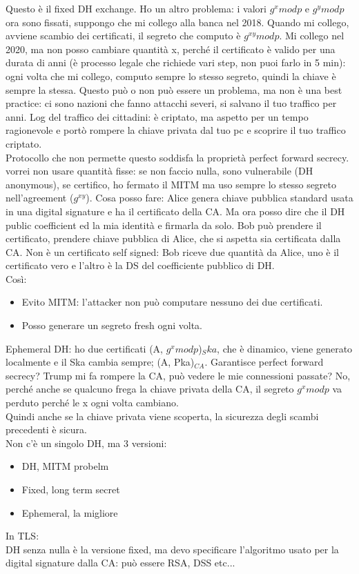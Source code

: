 \documentclass[16px]{article}
\begin{document}
Questo è il fixed DH exchange. Ho un altro problema: i valori $g^xmodp$ e $g^ymodp$ ora sono fissati, suppongo che mi collego alla banca nel 2018. Quando mi collego, avviene scambio dei certificati, il segreto che computo è $g^{xy}modp$. Mi collego nel 2020, ma non posso cambiare quantità x, perché il certificato è valido per una durata di anni (è processo legale che richiede vari step, non puoi farlo in 5 min): ogni volta che mi collego, computo sempre lo stesso segreto, quindi la chiave è sempre la stessa. Questo può o non può essere un problema, ma non è una best practice: ci sono nazioni che fanno attacchi severi, si salvano il tuo traffico per anni. Log del traffico dei cittadini: è criptato, ma aspetto per un tempo ragionevole e portò rompere la chiave privata dal tuo pc e scoprire il tuo traffico criptato.\\ Protocollo che non permette questo soddisfa la proprietà perfect forward secrecy.\\ vorrei non usare quantità fisse: se non faccio nulla, sono vulnerabile (DH anonymous), se certifico, ho fermato il MITM ma uso sempre lo stesso segreto nell'agreement ($g^{xy}$). Cosa posso fare: Alice genera chiave pubblica standard usata in una digital signature e ha il certificato della CA. Ma ora posso dire che il DH public coefficient ed la mia identità e firmarla da solo. Bob può prendere il certificato, prendere chiave pubblica di Alice, che si aspetta sia certificata dalla CA. Non è un certificato self signed: Bob riceve due quantità da Alice, uno è il certificato vero e l'altro è la DS del coefficiente pubblico di DH.\\ Così:
\begin{itemize}
\item Evito MITM: l'attacker non può computare nessuno dei due certificati.
\item Posso generare un segreto fresh ogni volta.
\end{itemize}
Ephemeral DH: ho due certificati (A, $g^xmodp$)$_Ska$, che è dinamico, viene generato localmente e il Ska cambia sempre; (A, Pka)$_{CA}$. Garantisce perfect forward secrecy? Trump mi fa rompere la CA, può vedere le mie connessioni passate? No, perché anche se qualcuno frega la chiave privata della CA, il segreto $g^xmodp$ va perduto perché le x ogni volta cambiano.\\ Quindi anche se la chiave privata viene scoperta, la sicurezza degli scambi precedenti è sicura.\\ Non c'è un singolo DH, ma 3 versioni:
\begin{itemize}
\item DH, MITM probelm
\item Fixed, long term secret
\item Ephemeral, la migliore
\end{itemize}
In TLS:\\
DH senza nulla è la versione fixed, ma devo specificare l'algoritmo usato per la digital signature dalla CA: può essere RSA, DSS etc...
\end{document}
